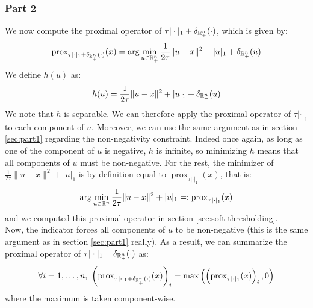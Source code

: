 \documentclass[12pt]{article}
\newcommand{\prox}{\operatorname{prox}}
\begin{document}
\subsubsection{Part 2}
We now compute the proximal operator of $\tau |\cdot|_1 + \delta_{\mathbb{R}_+^n} (\cdot)$, which is given by:
\begin{equation*}
  \prox_{\tau |\cdot|_1 + \delta_{\R_+^n} (\cdot)}(x) = \arg\min_{u \in \R_+^n} \frac{1}{2\tau}\|u-x\|^2 + |u|_1 + \delta_{\R_+^n} (u)
\end{equation*}
We define $h(u)$ as:
\begin{equation*}
  h(u) = \frac{1}{2\tau}\|u-x\|^2 + |u|_1 + \delta_{\mathbb{R}_+^n} (u)
\end{equation*}
We note that $h$ is separable. We can therefore apply the proximal operator of $\tau |\cdot|_1$ to each component of $u$. Moreover, we can use the same argument as in section \ref{sec:part1} regarding the non-negativity constraint. Indeed once again, as long as one of the component of $u$ is negative, $h$ is infinite, so minimizing $h$ means that all components of $u$ must be non-negative. For the rest, the minimizer of $\frac{1}{2\tau}\|u-x\|^2 + |u|_1$ is by definition equal to $\prox_{\tau |\cdot|_1}(x)$, that is:
\begin{equation*}
  \arg\min_{u \in \R^n} \frac{1}{2\tau}\|u-x\|^2 + |u|_1 =: \prox_{\tau |\cdot|_1}(x)
\end{equation*}
and we computed this proximal operator in section \ref{sec:soft-thresholding}. \\
Now, the indicator forces all components of $u$ to be non-negative (this is the same argument as in section \ref{sec:part1} really). As a result, we can summarize the proximal operator of $\tau |\cdot|_1 + \delta_{\mathbb{R}_+^n} (\cdot)$ as:
\begin{equation*}
  \forall i = 1, \ldots, n, \  \left(\prox_{\tau |\cdot|_1 + \delta_{\R_+^n} (\cdot)}(x)\right)_i = \max\left(\left(\prox_{\tau |\cdot|_1}(x)\right)_i, 0\right)
\end{equation*}
where the maximum is taken component-wise.
\end{document}
